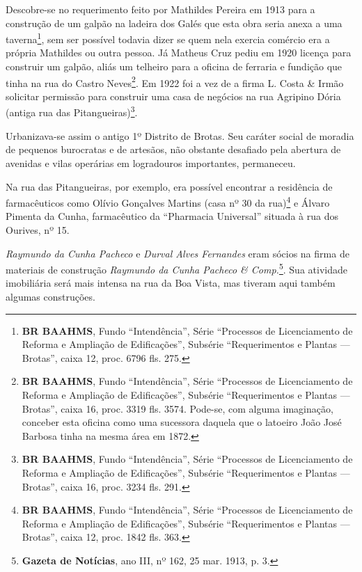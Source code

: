Descobre-se no requerimento feito por Mathildes Pereira em 1913 para a construção de um galpão na ladeira dos Galés que esta obra seria anexa a uma taverna\footnote{\textbf{BR BAAHMS}, Fundo ``Intendência'', Série ``Processos de Licenciamento de Reforma e Ampliação de Edificações'', Subsérie ``Requerimentos e Plantas --- Brotas'', caixa 12, proc. 6796 fls. 275.}, sem ser possível todavia dizer se quem nela exercia comércio era a própria Mathildes ou outra pessoa. Já Matheus Cruz pediu em 1920 licença para construir um galpão, aliás um telheiro para a oficina de ferraria e fundição que tinha na rua do Castro Neves\footnote{\textbf{BR BAAHMS}, Fundo ``Intendência'', Série ``Processos de Licenciamento de Reforma e Ampliação de Edificações'', Subsérie ``Requerimentos e Plantas --- Brotas'', caixa 16, proc. 3319 fls. 3574. Pode-se, com alguma imaginação, conceber esta oficina como uma sucessora daquela que o latoeiro João José Barbosa tinha na mesma área em 1872.}. Em 1922 foi a vez de a firma L. Costa \& Irmão solicitar permissão para construir uma casa de negócios na rua Agripino Dória (antiga rua das Pitangueiras)\footnote{\textbf{BR BAAHMS}, Fundo ``Intendência'', Série ``Processos de Licenciamento de Reforma e Ampliação de Edificações'', Subsérie ``Requerimentos e Plantas --- Brotas'', caixa 16, proc. 3234 fls. 291.}.


Urbanizava-se assim o antigo 1º Distrito de Brotas. Seu caráter social de moradia de pequenos burocratas e de artesãos, não obstante desafiado pela abertura de avenidas e vilas operárias em logradouros importantes, permaneceu.

Na rua das Pitangueiras, por exemplo, era possível encontrar a residência de farmacêuticos como Olívio Gonçalves Martins (casa nº 30 da rua)\footnote{\textbf{BR BAAHMS}, Fundo ``Intendência'', Série ``Processos de Licenciamento de Reforma e Ampliação de Edificações'', Subsérie ``Requerimentos e Plantas --- Brotas'', caixa 12, proc. 1842 fls. 363.} e Álvaro Pimenta da Cunha, farmacêutico da ``Pharmacia Universal'' situada à rua dos Ourives, nº 15\cite[p.~510]{reis_almanak_1903}.

\textit{Raymundo da Cunha Pacheco} e \textit{Durval Alves Fernandes} eram sócios na firma de materiais de construção \textit{Raymundo da Cunha Pacheco \& Comp.}\footnote{\textbf{Gazeta de Notícias}, ano III, nº 162, 25 mar. 1913, p. 3.}. Sua atividade imobiliária será mais intensa na rua da Boa Vista, mas tiveram aqui também algumas construções.

